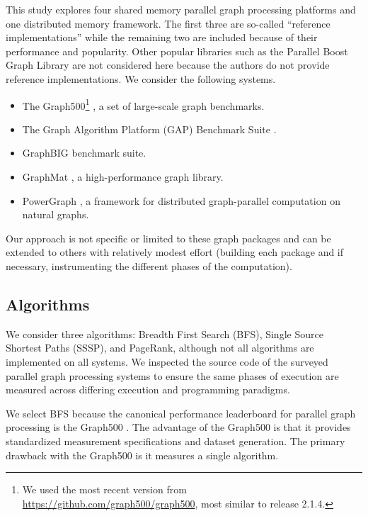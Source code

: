 \documentclass{llncs}
\begin{document}
This study explores four shared memory parallel graph processing platforms and one distributed memory framework. The first three are so-called ``reference implementations'' while the remaining two are included because of their performance and popularity. Other popular libraries such as the Parallel Boost Graph Library \cite{Gregor:2005:PBGL} are not considered here because the authors do not provide reference implementations. We consider the following systems.
\begin{itemize}
	\item The Graph500\footnote{We used the most recent version from \url{https://github.com/graph500/graph500}, most similar to release 2.1.4.} \cite{Murphy:2010:Graph500}, a set of large-scale graph benchmarks.
	\item The Graph Algorithm Platform (GAP) Benchmark Suite \cite{Beamer:2015:GAPBench}.
	\item GraphBIG \cite{Nai:2015:Graphbig} benchmark suite.
	\item GraphMat \cite{Sundaram:2015:GraphMat}, a high-performance graph library.
	\item PowerGraph \cite{Gonzalez:2012:Powergraph}, a framework for distributed graph-parallel computation on natural graphs.
\end{itemize}

Our approach is not specific or limited to these graph packages and can be extended to others with relatively modest effort (building each package and if necessary, instrumenting the different phases of the computation).

\subsection{Algorithms}\label{sec:algs}


We consider three algorithms: Breadth First Search (BFS), Single Source Shortest Paths (SSSP), and PageRank, although not all algorithms are implemented on all systems. We inspected the source code of the surveyed parallel graph processing systems to ensure the same phases of execution are measured across differing execution and programming paradigms. 

We select BFS because the canonical performance leaderboard for parallel graph processing is the Graph500 \cite{Murphy:2010:Graph500}. The advantage of the Graph500 is that it provides standardized measurement specifications and dataset generation. The primary drawback with the Graph500 is it measures a single algorithm.
\end{document}
